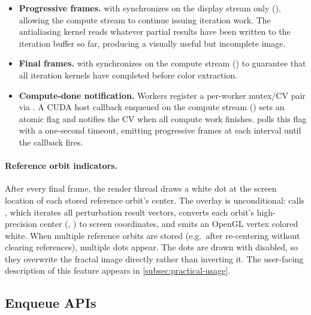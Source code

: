 \begin{itemize}
  \item \textbf{Progressive frames.}
         with 
        synchronizes on the display stream only
        (), allowing the compute stream to
        continue issuing iteration work.  The antialiasing kernel
        reads whatever partial results have been written to the
        iteration buffer so far, producing a visually useful but
        incomplete image.
  \item \textbf{Final frames.}
         with 
        synchronizes on the compute stream
        () to guarantee that all iteration
        kernels have completed before color extraction.
  \item \textbf{Compute-done notification.}
        Workers register a per-worker mutex/CV pair via
        .  A CUDA host callback
        enqueued on the compute stream ()
        sets an atomic flag and notifies the CV when all compute work
        finishes.  
        polls this flag with a one-second timeout, emitting
        progressive frames at each interval until the callback fires.
\end{itemize}

\paragraph{Reference orbit indicators.}
\label{par:ref-orbit-indicators}
After every final frame, the render thread draws a white dot at the
screen location of each stored reference orbit's center.  The overlay
is unconditional:  calls
, which iterates all perturbation
result vectors, converts each orbit's high-precision center
(, ) to screen coordinates, and emits an
OpenGL  vertex colored white.  When multiple
reference orbits are stored (e.g.\ after re-centering without clearing
references), multiple dots appear.  The dots are drawn with
 disabled, so they overwrite the fractal
image directly rather than inverting it.  The user-facing description
of this feature appears in \cref{subsec:practical-usage}.

\subsection{Enqueue APIs}

